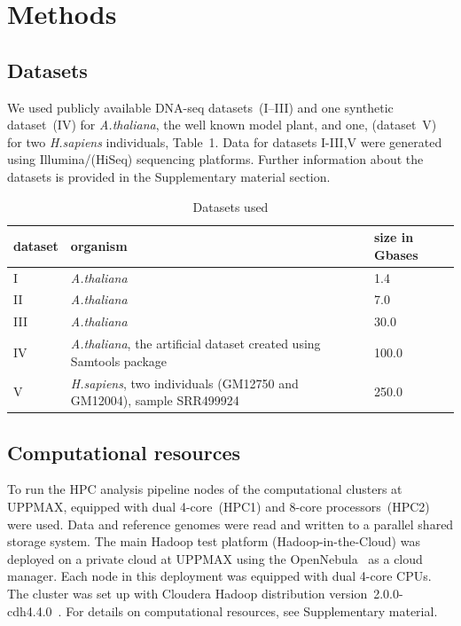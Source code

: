 \documentclass[11pt, oneside]{article}   	%
\begin{document}
\section{Methods}
\label{sectionII}

\subsection{Datasets}
We used publicly available DNA-seq datasets~(I--III) and one synthetic dataset~(IV) for {\it A.thaliana}, the well known model plant, and one, (dataset~V) for two {\it H.sapiens} individuals, Table~1. Data for datasets I-III,V were generated using Illumina/(HiSeq) sequencing platforms. Further information about the datasets is provided in the Supplementary material section.


\begin{table}[htdp]
\small
\caption{Datasets used}
\begin{center}
\begin{tabular}{|l|l|l|}
dataset &	organism &	size in Gbases\\
\hline
 I		&	{\it A.thaliana}	&	1.4	\\
 II	&	{\it A.thaliana}	&	7.0\\
  III	&	{\it A.thaliana}	&	30.0	\\
 IV	&{\it A.thaliana}, the artificial dataset created using Samtools package	&	100.0	\\
 V	&	{\it H.sapiens}, two individuals (GM12750 and GM12004), sample SRR499924		&	250.0\\

\end{tabular}
\end{center}
\label{table:datasets}
\normalsize
\end{table}%



\subsection{Computational resources}
To run the HPC analysis pipeline nodes of  the computational clusters at UPPMAX, equipped with dual 4-core~(HPC1) and 8-core processors~(HPC2) were used. Data and reference genomes were read and written to a parallel shared storage system. The main Hadoop test platform (Hadoop-in-the-Cloud) was deployed on a private cloud at UPPMAX using the OpenNebula~\cite{opennebula} as a cloud manager. Each node in this deployment was equipped with dual 4-core CPUs. The cluster was set up with Cloudera Hadoop distribution version~2.0.0-cdh4.4.0~\cite{cloudera}. For details on computational resources, see Supplementary material.
\end{document}

